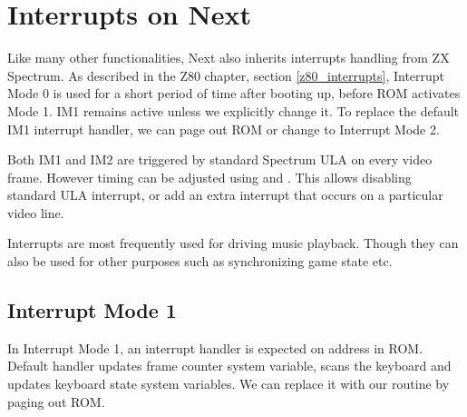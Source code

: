 \section{Interrupts on Next}
\label{zx_next_interrupts}


Like many other functionalities, Next also inherits interrupts handling from ZX Spectrum. As described in the Z80 chapter, section \ref{z80_interrupts}, Interrupt Mode 0 is used for a short period of time after booting up, before ROM activates Mode 1. IM1 remains active unless we explicitly change it. To replace the default IM1 interrupt handler, we can page out ROM or change to Interrupt Mode 2.

Both IM1 and IM2 are triggered by standard Spectrum ULA on every video frame. However timing can be adjusted using  and . This allows disabling standard ULA interrupt, or add an extra interrupt that occurs on a particular video line.

Interrupts are most frequently used for driving music playback. Though they can also be used for other purposes such as synchronizing game state etc.


\subsection{Interrupt Mode 1}

In Interrupt Mode 1, an interrupt handler is expected on address  in ROM. Default handler updates frame counter system variable, scans the keyboard and updates keyboard state system variables. We can replace it with our routine by paging out ROM.

